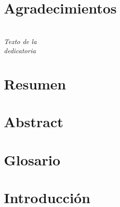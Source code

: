 
\section*{Agradecimientos}

\newpage
\thispagestyle{empty}
\cleardoublepage
\pagestyle{fancy}

\section*{}
\begin{flushright}
\vspace {13cm}
\textit{\large Texto de la \\dedicatoria}\\[1.5cm]
\end{flushright}
\newpage
\thispagestyle{empty}
\cleardoublepage
\pagestyle{fancy}

\section*{Resumen}

\newpage
\thispagestyle{empty}
\cleardoublepage
\pagestyle{fancy}

\section*{Abstract}

\newpage
\thispagestyle{empty}
\cleardoublepage
\pagestyle{fancy}

\section*{Glosario}

\newpage
\thispagestyle{empty}
\cleardoublepage
\pagestyle{fancy}

\section*{Introducci\'on}

\newpage
\thispagestyle{empty}
\cleardoublepage
\pagestyle{fancy}
